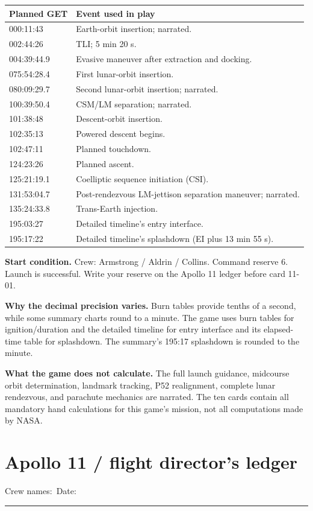 \documentclass[11pt]{article}
\begin{document}
\begin{tabularx}{\linewidth}{@{}lX@{}}
\toprule
Planned GET & Event used in play\\
\midrule
000:11:43 & Earth-orbit insertion; narrated.\\
002:44:26 & TLI; 5 min 20 s.\\
004:39:44.9 & Evasive maneuver after extraction and docking.\\
075:54:28.4 & First lunar-orbit insertion.\\
080:09:29.7 & Second lunar-orbit insertion; narrated.\\
100:39:50.4 & CSM/LM separation; narrated.\\
101:38:48 & Descent-orbit insertion.\\
102:35:13 & Powered descent begins.\\
102:47:11 & Planned touchdown.\\
124:23:26 & Planned ascent.\\
125:21:19.1 & Coelliptic sequence initiation (CSI).\\
131:53:04.7 & Post-rendezvous LM-jettison separation maneuver; narrated.\\
135:24:33.8 & Trans-Earth injection.\\
195:03:27 & Detailed timeline's entry interface.\\
195:17:22 & Detailed timeline's splashdown (EI plus 13 min 55 s).\\
\bottomrule
\end{tabularx}

\textbf{Start condition.} Crew: Armstrong / Aldrin / Collins.
Command reserve 6. Launch is successful. Write your reserve on the
Apollo 11 ledger before card 11-01.

\textbf{Why the decimal precision varies.} Burn tables provide tenths
of a second, while some summary charts round to a minute.
The game uses burn tables for ignition/duration and the detailed
timeline for entry interface and its elapsed-time table for splashdown.
The summary's 195:17 splashdown is rounded to the minute.

\textbf{What the game does not calculate.} The full launch guidance,
midcourse orbit determination, landmark tracking, P52 realignment,
complete lunar rendezvous, and parachute mechanics are narrated.
The ten cards contain all mandatory hand calculations for this
game's mission, not all computations made by NASA.



\clearpage
\section*{Apollo 11 / flight director's ledger}
Crew names:\ \hrulefill\qquad Date:\ \rule{1in}{0.3pt}
\end{document}
